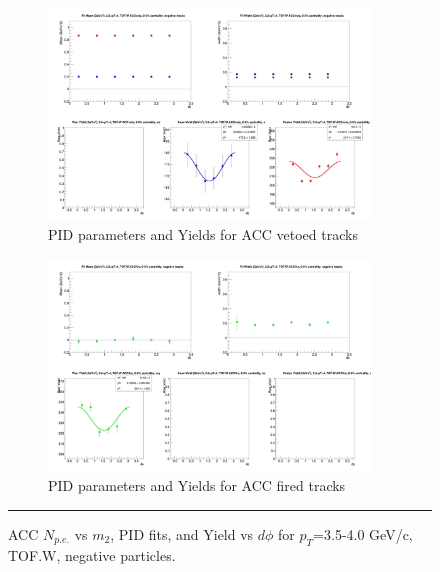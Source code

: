 \begin{figure}[H]
  \ContinuedFloat
    \vspace*{-1cm}
    \begin{subfigure}{1\textwidth}
   \centering
   \includegraphics[width=0.94\textwidth]{hiptfits/neg/fitParams_tof2_cent0_ch0_pT-35-40.jpg}
    \caption{PID parameters and Yields for ACC vetoed tracks}
    \end{subfigure}    
    \begin{subfigure}{1\textwidth}
   \centering
   \includegraphics[width=0.94\textwidth]{hiptfits/neg/fitParams_tof3_cent0_ch0_pT-35-40.jpg}
    \caption{PID parameters and Yields for ACC fired tracks}
    \end{subfigure} 
    \rule{35em}{0.5pt}
  \caption[ACC $N_{p.e.}$ vs $m_2$, PID fits, and Yield vs $d\phi$ for $p_T$=3.5-4.0 GeV/c, TOF.W, negative particles.]{ACC $N_{p.e.}$ vs $m_2$, PID fits, and Yield vs $d\phi$ for $p_T$=3.5-4.0 GeV/c, TOF.W, negative particles.}
  \label{fig:acc35-40neg}
\end{figure}

